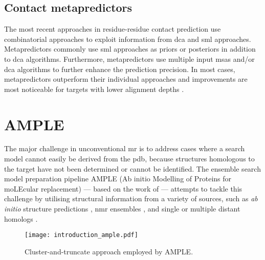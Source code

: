\subsection{Contact metapredictors}
The most recent approaches in residue-residue contact prediction use combinatorial approaches to exploit information from \gls{dca} and \gls{sml} approaches. Metapredictors commonly use \gls{sml} approaches as priors \cite{Ovchinnikov2015-tn} or posteriors \cite{Skwark2014-qp,Jones2015-vq,Adhikari2017-kt,He2017-fn,Michel2017-pm,Wang2017-rx} in addition to \gls{dca} algorithms. Furthermore, metapredictors use multiple input \gls{msa}s and/or \gls{dca} algorithms to further enhance the prediction precision. In most cases, metapredictors outperform their individual approaches and improvements are most noticeable for targets with lower alignment depths \cite{De_Oliveira2017-gj,Wuyun2016-hh,Wang2017-rx}.

%
%

\section{AMPLE}
The major challenge in unconventional \gls{mr} is to address cases where a search model cannot easily be derived from the \gls{pdb}, because structures homologous to the target have not been determined or cannot be identified. The ensemble search model preparation pipeline AMPLE (Ab initio Modelling of Proteins for moLEcular replacement) --- based on the work of \textcite{Rigden2008-vo} --- attempts to tackle this challenge by utilising structural information from a variety of sources, such as \textit{ab initio} structure predictions \cite{Bibby2012-lm,Keegan2015-zb,Simkovic2016-wk,Thomas2015-wu,Thomas2017-sh}, \gls{nmr} ensembles \cite{Bibby2013-cp}, and single \cite{Rigden2018-zt} or multiple distant homologs \cite{Bruhn2014-aa,Hotta2014-me}. 

\begin{figure}[H]
    \centering
    \texttt{[image: introduction\_ample.pdf]}
    \caption{Cluster-and-truncate approach employed by AMPLE.}
    \label{fig:introduction_ample}
\end{figure}

